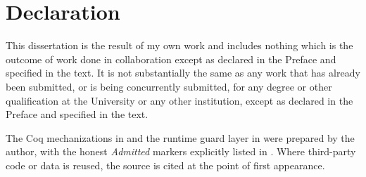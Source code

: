 %
%

\chapter*{Declaration}
\thispagestyle{plain}

This dissertation is the result of my own work and includes nothing
which is the outcome of work done in collaboration except as declared
in the Preface and specified in the text. It is not substantially the
same as any work that has already been submitted, or is being
concurrently submitted, for any degree or other qualification at the
University or any other institution, except as declared in the Preface
and specified in the text.

The Coq mechanizations in
\href{https://github.com/gHashTag/trinity-clara/tree/main/proofs/igla}{}
and the runtime guard layer in
\href{https://github.com/gHashTag/trios/tree/main/crates/trios-igla-race}{}
were prepared by the author, with the honest \emph{Admitted} markers
explicitly listed in
\href{https://github.com/gHashTag/trios/blob/main/assertions/igla_assertions.json}{}.
Where third-party code or data is reused, the source is cited at the
point of first appearance.


